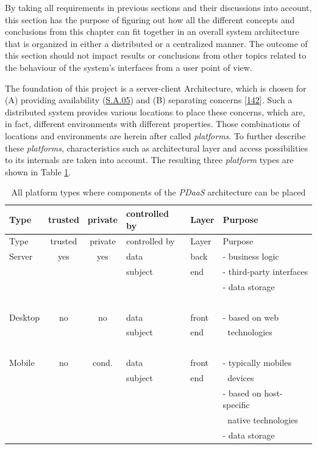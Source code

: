 \documentclass[12pt,english,a4paper,titlepage,cleardoublepage=empty,dottedtoc]{report}
\begin{document}
By taking all requirements in previous sections and their discussions
into account, this section has the purpose of figuring out how all the
different concepts and conclusions from this chapter can fit together in
an overall system architecture that is organized in either a distributed
or a centralized manner. The outcome of this section should not impact
results or conclusions from other topics related to the behaviour of the
system's interfaces from a user point of view.

The foundation of this project is a server-client Architecture, which is
chosen for (A) providing availability (\protect\hyperlink{sa05}{S.A.05})
and (B) separating concerns
{[}\protect\hyperlink{ref-web_2016_wikipedia_separation-of-concerns}{142}{]}.
Such a distributed system provides various locations to place these
concerns, which are, in fact, different environments with different
properties. Those combinations of locations and environments are herein
after called \emph{platforms}. To further describe these
\emph{platforms}, characteristics such as architectural layer and access
possibilities to its internals are taken into account. The resulting
three \emph{platform} types are shown in Table
\ref{tbl:platforms-characteristics}.

\begin{longtable}[]{@{}lcclll@{}}
\caption{All platform types where components of the \emph{PDaaS}
architecture can be placed
\label{tbl:platforms-characteristics}}\tabularnewline
\toprule
Type & trusted & private & controlled by & Layer &
Purpose\tabularnewline
\midrule
\endfirsthead
\toprule
Type & trusted & private & controlled by & Layer &
Purpose\tabularnewline
\midrule
\endhead
Server & yes & yes & data & back & - business logic\tabularnewline
\(\ \) & \(\ \) & \(\ \) & subject & end & - third-party
interfaces\tabularnewline
\(\ \) & \(\ \) & \(\ \) & \(\ \) & \(\ \) & - data
storage\tabularnewline
\(\ \) & \(\ \) & \(\ \) & \(\ \) & \(\ \) & \(\ \)\tabularnewline
Desktop & no & no & data & front & - based on web\tabularnewline
\(\ \) & \(\ \) & \(\ \) & subject & end & \(\ \)
technologies\tabularnewline
\(\ \) & \(\ \) & \(\ \) & \(\ \) & \(\ \) & \(\ \)\tabularnewline
Mobile & no & cond. & data & front & - typically mobiles\tabularnewline
\(\ \) & \(\ \) & \(\ \) & subject & end & \(\ \) devices\tabularnewline
\(\ \) & \(\ \) & \(\ \) & \(\ \) & \(\ \) & - based on
host-specific\tabularnewline
\(\ \) & \(\ \) & \(\ \) & \(\ \) & \(\ \) & \(\ \) native
technologies\tabularnewline
\(\ \) & \(\ \) & \(\ \) & \(\ \) & \(\ \) & - data
storage\tabularnewline
\bottomrule
\end{longtable}
\end{document}
